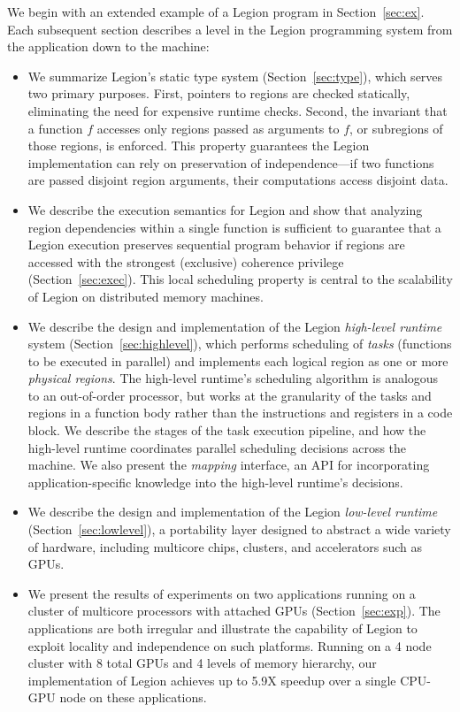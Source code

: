 \documentclass[9pt,nocopyrightspace]{sigplanconf}
\begin{document}
We begin with an extended example of a Legion program in Section~\ref{sec:ex}.
Each subsequent section describes a level in the Legion programming
system from the application down to the machine:
 
\begin{itemize}

\item We summarize Legion's static type system (Section~\ref{sec:type}), which serves two primary
  purposes.  First, pointers to regions are checked
  statically, eliminating the need for expensive runtime checks.
  Second, the invariant that a function $f$ accesses only
  regions passed as arguments to $f$, or subregions of those regions, is enforced.
  This property guarantees the Legion implementation can rely on
  preservation of independence---if two functions are passed disjoint
  region arguments, their computations access disjoint
data.  

\item We describe the execution semantics for Legion and show that
analyzing region dependencies within a single function is sufficient to 
guarantee that a Legion execution preserves sequential program
behavior if regions are accessed with the strongest (exclusive)
coherence privilege (Section~\ref{sec:exec}).  This local scheduling property is central to 
the scalability of Legion on distributed memory machines.

\item We describe the design and implementation of the Legion {\em high-level runtime}
system (Section~\ref{sec:highlevel}), which performs scheduling of {\em tasks} (functions to be executed in parallel)
and implements each logical region as one or more {\em physical regions}.
The high-level runtime's scheduling algorithm is analogous to an out-of-order processor,
but works at the granularity of the tasks and regions in a function body rather than the instructions and registers
in a code block.  We describe the stages of the task execution pipeline, and how the high-level runtime coordinates parallel
scheduling decisions across the machine.  We also present the {\em mapping} interface, an API for incorporating
application-specific knowledge into the high-level runtime's decisions.

\item We describe the design and implementation of the Legion {\em low-level runtime} (Section~\ref{sec:lowlevel}),
a portability layer designed to abstract a wide variety of hardware, including multicore chips, clusters, and accelerators
such as GPUs. 

\item We present the results of experiments on two applications running on a cluster of multicore processors with
attached GPUs (Section~\ref{sec:exp}).  The applications are both irregular and illustrate the capability of Legion to 
exploit locality and independence on such platforms.
Running on a 4 node cluster with 8 total GPUs 
and 4 levels of memory hierarchy, our implementation of Legion 
achieves up to 5.9X speedup over a single CPU-GPU node on these applications.

\end{itemize}
\end{document}
